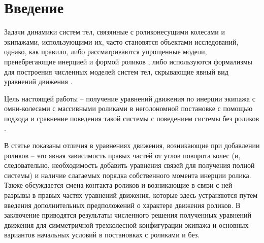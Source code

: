 \section{Введение}

Задачи динамики систем тел, связянные с роликонесущими колесами и экипажами, использующими их, часто становятся объектами исследований, однако, как правило, либо рассматриваются упрощенные модели, пренебрегающие инерцией и формой роликов \cite{ZobovaTatarinov, Martynenko, Borisov}, либо используются формализмы для построения численных моделей систем тел, скрывающие явный вид уравнений движения \cite{KosenkoGerasimov, MaybeTobolar, Others}.

Цель настоящей работы -- получение уравнений движения по инерции экипажа с омни-колесами с массивными роликами в неголономной постановке с помощью подхода \cite{Tatarinov} и сравнение поведения такой системы с поведением системы без роликов \cite{Zobova2011}.



В статье показаны отличия в уравнениях движения, возникающие при добавлении роликов -- это явная зависимость правых частей от углов поворота колес (и, следовательно, необходимость добавить уравнения связей для получения полной системы) и наличие слагаемых порядка собственного момента инерции ролика. Также обсуждается смена контакта роликов и возникающие в связи с ней разрывы в правых частях уравнений движения, которые здесь устраняются путем введения дополнительных предположений о характере движения роликов. В заключение приводятся результаты численного решения полученных уравнений движения для симметричной трехколесной конфигурации экипажа и основных вариантов начальных условий в постановках с роликами и без.


